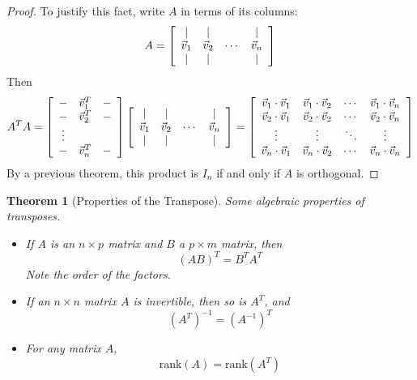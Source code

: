 \documentclass[10pt]{report}
\newtheorem{thm2}{Theorem}[section]
\begin{document}
\begin{proof}
To justify this fact, write $A$ in terms of its columns:
$$A = \left[ \begin{array}{c c c c}
| & | & & |\\
\vec{v}_1 & \vec{v}_2 & \cdots & \vec{v}_n\\
| & | & & |
\end{array}\right ]$$
Then
$$A^TA = \left[\begin{array}{c c c}
- & \vec{v}_1^T & -\\
- & \vec{v}_2^T & -\\
\vdots\\
- & \vec{v}_n^T & -
\end{array}\right]
\left[\begin{array}{c c c c}
| & | & & |\\
\vec{v}_1 & \vec{v}_2 & \cdots & \vec{v}_n\\
| & | & & |
\end{array}\right] = 
\left[\begin{array}{c c c c}
\vec{v}_1 \cdot \vec{v}_1 & \vec{v}_1 \cdot \vec{v}_2 & \cdots & \vec{v}_1 \cdot \vec{v}_n\\
\vec{v}_2 \cdot \vec{v}_1 & \vec{v}_2 \cdot \vec{v}_2 & \cdots & \vec{v}_2 \cdot \vec{v}_n\\
\vdots & \vdots & \ddots & \vdots\\
\vec{v}_n \cdot \vec{v}_1 & \vec{v}_n \cdot \vec{v}_2 & \cdots & \vec{v}_n \cdot \vec{v}_n
\end{array}\right]$$
By a previous theorem, this product is $I_n$ if and only if $A$ is orthogonal.
\end{proof}
\begin{thm2}[Properties of the Transpose]
Some algebraic properties of transposes.
\begin{itemize}
\item[a.] If $A$ is an $n\times p$ matrix and $B$ a $p\times m$ matrix, then
$$(AB)^T = B^TA^T$$
Note the order of the factors.
\item[b.]If an $n\times n$ matrix $A$ is invertible, then so is $A^T$, and 
$$(A^T)^{-1} = (A^{-1})^T$$
\item[c.] For any matrix $A$, 
$$\text{rank}(A) = \text{rank}(A^T)$$
\end{itemize}
\end{thm2}
\end{document}
